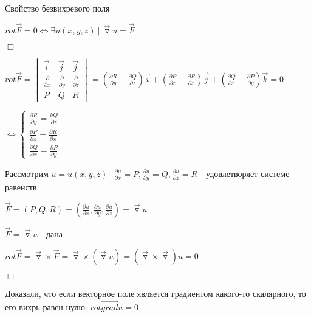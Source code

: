 \documentclass[12pt]{article}
\begin{document}
    \hypertarget{irrotationalfieldproperty}{}

     Свойство безвихревого поля

    $rot \overrightarrow{F} = 0 \Longleftrightarrow \exists u(x, y, z) \ | \ \overrightarrow{\triangledown}u = \overrightarrow{F}$

    $\Box$ \fbox{\Longrightarrow}

    $rot \overrightarrow{F} =
    \begin{vmatrix}
        \overrightarrow{i}          & \overrightarrow{j}          & \overrightarrow{j}          \\
        \frac{\partial}{\partial x} & \frac{\partial}{\partial y} & \frac{\partial}{\partial z} \\
        P & Q & R
    \end{vmatrix} = \left(\frac{\partial R}{\partial y} - \frac{\partial Q}{\partial z}\right)\overrightarrow{i} + \left(\frac{\partial P}{\partial z} - \frac{\partial R}{\partial x}\right)\overrightarrow{j} + \left(\frac{\partial Q}{\partial x} - \frac{\partial P}{\partial y}\right)\overrightarrow{k} = 0$

    $\Longleftrightarrow
    \begin{cases}
        \frac{\partial R}{\partial y} = \frac{\partial Q}{\partial z} \\
        \frac{\partial P}{\partial z} = \frac{\partial R}{\partial x} \\
        \frac{\partial Q}{\partial x} = \frac{\partial P}{\partial y}
    \end{cases}$

    Рассмотрим $u = u(x, y, z) \ | \ \frac{\partial u}{\partial x} = P, \frac{\partial u}{\partial y} = Q, \frac{\partial u}{\partial z} = R$ - удовлетворяет системе равенств

    $\overrightarrow{F} = (P, Q, R) = \left(\frac{\partial u}{\partial x}, \frac{\partial u}{\partial y}, \frac{\partial u}{\partial z}\right) = \overrightarrow{\triangledown} u$

    \fbox{\Longleftarrow} $\overrightarrow{F} = \overrightarrow{\triangledown}u$ - дана

    $rot \overrightarrow{F} = \overrightarrow{\triangledown} \times \overrightarrow{F} = \overrightarrow{\triangledown} \times (\overrightarrow{\triangledown} u) = (\overrightarrow{\triangledown} \times \overrightarrow{\triangledown}) u = 0$

    $\Box$

    \Nota Доказали, что если векторное поле является градиентом какого-то скалярного, то его вихрь равен нулю: $rot \overrightarrow{grad} u = 0$
\end{document}
